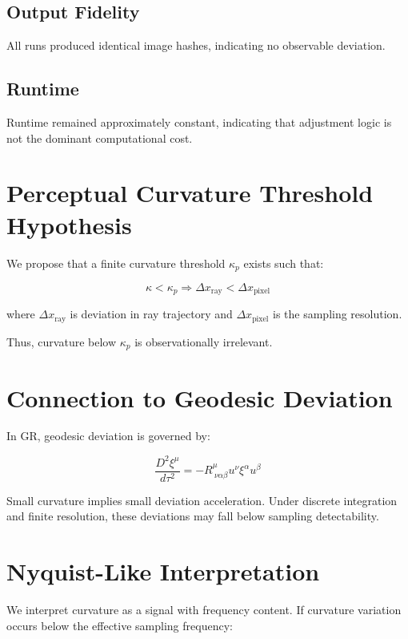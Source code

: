 \documentclass[11pt]{article}
\begin{document}
\subsection{Output Fidelity}

All runs produced identical image hashes, indicating no observable deviation.

\subsection{Runtime}

Runtime remained approximately constant, indicating that adjustment logic is not the dominant computational cost.

\section{Perceptual Curvature Threshold Hypothesis}

We propose that a finite curvature threshold $\kappa_p$ exists such that:

\begin{equation}
\kappa < \kappa_p \Rightarrow \Delta x_{\text{ray}} < \Delta x_{\text{pixel}}
\end{equation}

where $\Delta x_{\text{ray}}$ is deviation in ray trajectory and $\Delta x_{\text{pixel}}$ is the sampling resolution.

Thus, curvature below $\kappa_p$ is observationally irrelevant.

\section{Connection to Geodesic Deviation}

In GR, geodesic deviation is governed by:

\begin{equation}
\frac{D^2 \xi^\mu}{d\tau^2} = - R^\mu_{\ \nu\alpha\beta} u^\nu \xi^\alpha u^\beta
\end{equation}

Small curvature implies small deviation acceleration. Under discrete integration and finite resolution, these deviations may fall below sampling detectability.

\section{Nyquist-Like Interpretation}

We interpret curvature as a signal with frequency content. If curvature variation occurs below the effective sampling frequency:
\end{document}
